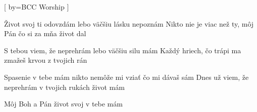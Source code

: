 [
  by={BCC Worship}
]

\beginverse
Život svoj ti odovzdám
lebo väčšiu lásku nepoznám
Nikto nie je viac než ty, môj Pán
čo si za mňa život dal
\endverse

\beginverse
S tebou viem, že neprehrám
lebo väčšiu silu mám
Každý hriech, čo trápi ma
zmažeš krvou z tvojich rán
\endverse

\beginchorus
Spasenie v tebe mám
nikto nemôže mi vziať
čo mi dávaš sám
Dnes už viem, že neprehrám
v tvojich rukách život mám
\endchorus

\beginverse
Môj Boh a Pán
život svoj v tebe mám
\endverse

\endsong
